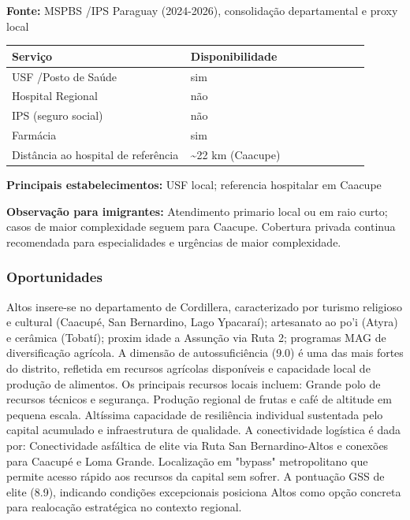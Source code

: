 \textbf{Fonte:} MSPBS /\allowbreak  IPS Paraguay (2024-2026), consolidação
departamental e proxy local

{\def\LTcaptype{none} %
\begin{longtable}{@{}>{\raggedright\arraybackslash}p{0.45\linewidth} >{\raggedright\arraybackslash}p{0.45\linewidth}@{}}
\toprule\noalign{}
Serviço & Disponibilidade \\
\midrule\noalign{}
\endhead
\bottomrule\noalign{}
\endlastfoot
USF /\allowbreak  Posto de Saúde & sim \\
Hospital Regional & não \\
IPS (seguro social) & não \\
Farmácia & sim \\
Distância ao hospital de referência & \textasciitilde22 km (Caacupe) \\
\end{longtable}
}

\textbf{Principais estabelecimentos:} USF local; referencia hospitalar
em Caacupe

\textbf{Observação para imigrantes:} Atendimento primario local ou em
raio curto; casos de maior complexidade seguem para Caacupe. Cobertura
privada continua recomendada para especialidades e urgências de maior
complexidade.
\newpage

\subsubsection*{Oportunidades}\label{oport-altos-0302}
Altos insere-se no departamento de Cordillera, caracterizado por turismo religioso e cultural (Caacupé, San Bernardino, Lago Ypacaraí); artesanato ao po'i (Atyra) e cerâmica (Tobatí); proxim idade a Assunção via Ruta 2; programas MAG de diversificação agrícola. A dimensão de autossuficiência (9.0) é uma das mais fortes do distrito, refletida em recursos agrícolas disponíveis e capacidade local de produção de alimentos. Os principais recursos locais incluem: Grande polo de recursos técnicos e segurança. Produção regional de frutas e café de altitude em pequena escala. Altíssima capacidade de resiliência individual sustentada pelo capital acumulado e infraestrutura de qualidade. A conectividade logística é dada por: Conectividade asfáltica de elite via Ruta San Bernardino-Altos e conexões para Caacupé e Loma Grande. Localização em "bypass" metropolitano que permite acesso rápido aos recursos da capital sem sofrer. A pontuação GSS de elite (8.9), indicando condições excepcionais posiciona Altos como opção concreta para realocação estratégica no contexto regional.

